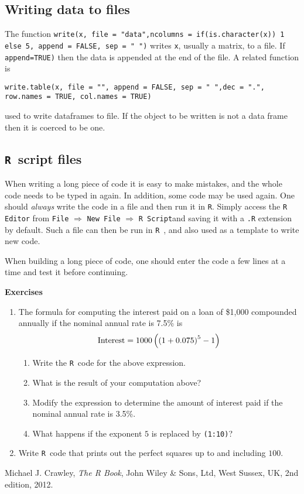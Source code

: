 \documentclass[12pt,A4,makeidx]{article}
\newcommand{\tR}{\texttt{R}}
\begin{document}
\subsection{Writing data to files}
The function \texttt{write(x, file = "data",ncolumns = if(is.character(x)) 1 else 5, append = FALSE, sep = " ")} writes
\texttt{x}, usually a matrix, to a file. If
\texttt{append=TRUE)} then the data is appended at the end of the file. 
A related function is 

\texttt{write.table(x, file = "", append = FALSE, sep = " ",dec = ".", row.names = TRUE, col.names = TRUE)}

used to write dataframes to file. If 
the object to be written is not a data frame then it is coerced to be one. 

\subsection{\tR\ script files}

When writing a long piece of code it is easy to make mistakes, and the whole code needs to be typed in again. In addition, some code may be used again. 
One should {\it always} write the code in a file and then run it in
\tR. Simply access the \texttt{R Editor} from 
\texttt{File} $\Rightarrow$ \texttt{New File} $\Rightarrow$ \texttt{R Script}and saving it with a \texttt{.R} extension by default. Such a file can then be 
run in \tR\ , and also used as a template to write new code. 

When building a long piece of code, one should enter the code a few lines at a time and test it before continuing.

{\bf Exercises}
\begin{enumerate}
\item The formula for computing the interest paid  on a loan of
\$1,000 compounded annually if the nominal annual rate is 7.5\% is
$${\rm Interest} = 1000\left(\left(1+0.075\right)^5-1\right)$$
\begin{enumerate}
\item Write the \tR \ code for the above expression.
\item What is the result of your computation above?
\item Modify the expression to determine the amount of interest paid if the nominal annual rate is 3.5\%.
\item What happens if the exponent $5$ is replaced by \texttt{(1:10)}?
\end{enumerate}
\item Write  \tR \ code that prints out the perfect squares up to and including $100$.
\end{enumerate}


\begin{thebibliography}{9}
Michael J. Crawley,
  \textit{The R Book},
  John Wiley \& Sons, Ltd, West Sussex, UK,
  2nd edition,
  2012.
\end{thebibliography}
\end{document}
